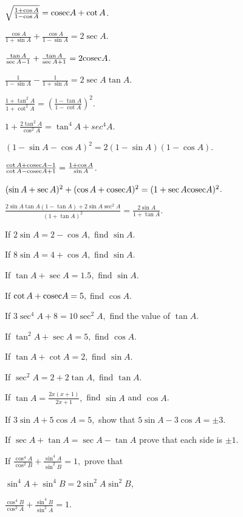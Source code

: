 \item $\sqrt{\frac{1 + \cos A}{1 - \cos A}} = {\rm cosec} A + \cot A$.
\item $\frac{\cos A}{1 + \sin A} + \frac{\cos A}{1 - \sin A} = 2\sec A$.
\item $\frac{\tan A}{\sec A - 1} + \frac{\tan A}{\sec A + 1} = 2{\rm cosec} A$.
\item $\frac{1}{1 - \sin A} - \frac{1}{1 + \sin A} = 2\sec A\tan A$.
\item $\frac{1 + \tan^2 A}{1 + \cot^2 A} = \left(\frac{1 - \tan A}{1 - \cot A}\right)^2$.
\item $1 + \frac{2\tan^2 A}{\cos^2 A} = \tan^4 A + sec^4 A$.
\item $(1 - \sin A - \cos A)^2 = 2(1 - \sin A)(1 - \cos A)$.
\item $\frac{\cot A + {\rm cosec} A - 1}{\cot A - {\rm cosec} A + 1} = \frac{1 + \cos A}{\sin A}$.
\item $(\sin A + \sec A)^2 + (\cos A + {\rm cosec} A)^2 = (1 + \sec A{\rm cosec} A)^2$.
\item $\frac{2\sin A\tan A(1 - \tan A) + 2\sin A\sec^2A}{(1 + \tan A)^2} = \frac{2\sin A}{1 + \tan A}$.
\item If $2\sin A = 2 - \cos A,$ find $\sin A$.
\item If $8\sin A = 4 + \cos A,$ find $\sin A$.
\item If $\tan A + \sec A = 1.5,$ find $\sin A$.
\item If $\cot A + {\rm cosec} A = 5,$ find $\cos A$.
\item If $3\sec^4 A + 8 = 10\sec^2A,$ find the value of $\tan A$.
\item If $\tan^2A + \sec A = 5,$ find $\cos A$.
\item If $\tan A + \cot A = 2,$ find $\sin A$.
\item If $\sec^2A = 2 + 2\tan A,$ find $\tan A$.
\item If $\tan A = \frac{2x(x + 1)}{2x + 1},$ find $\sin A$ and $\cos A$.
\item If $3\sin A + 5\cos A = 5,$ show that $5\sin A - 3\cos A = \pm 3$.
\item If $\sec A + \tan A = \sec A - \tan A$ prove that each side is $\pm 1$.
\item If $\frac{\cos^4 A}{\cos^2 B} + \frac{\sin^4 A}{\sin^2 B} = 1,$ prove that
  \startitemize[i]
    \item $\sin^4A + \sin^4B = 2\sin^2A \sin^2B$,
    \item $\frac{\cos^4 B}{\cos^2 A} + \frac{\sin^4 B}{\sin^2 A} = 1$.
